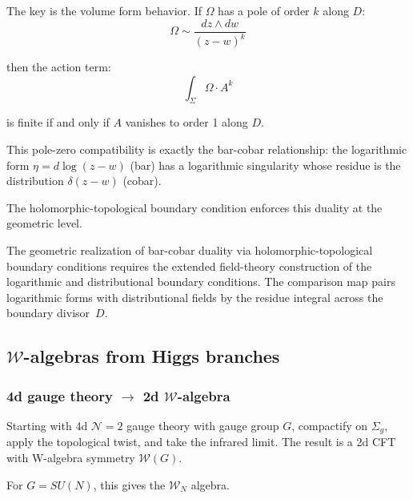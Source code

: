 \begin{remark}
The key is the volume form behavior. If $\Omega$ has a pole of order $k$ along
$D$:
\[\Omega \sim \frac{dz \wedge dw}{(z-w)^k}\]

then the action term:
\[\int_{\Sigma} \Omega \cdot A^k\]

is finite if and only if $A$ vanishes to order 1 along $D$.

This pole-zero compatibility is exactly the bar-cobar relationship: the logarithmic form $\eta = d\log(z-w)$ (bar) has a logarithmic singularity whose residue is the distribution $\delta(z-w)$ (cobar).

The holomorphic-topological boundary condition enforces this duality at the
geometric level.
\end{remark}

\begin{remark}
The geometric realization of bar-cobar duality via
holomorphic-topological boundary conditions requires the extended
field-theory construction of the logarithmic and distributional
boundary conditions. The comparison map pairs logarithmic forms with
distributional fields by the residue integral across the boundary
divisor~$D$.
\end{remark}

\subsection{$\mathcal{W}$-algebras from Higgs branches}

\subsubsection{\texorpdfstring{4d gauge theory $\to$ 2d $\mathcal{W}$-algebra}{4d gauge theory -> 2d $\mathcal{W}$-algebra}}

\begin{remark}
\label{rem:costello-gaiotto-agt}
Starting with 4d $\mathcal{N}=2$ gauge theory with gauge group $G$, compactify on $\Sigma_g$, apply the topological twist, and take the infrared limit. The result is a 2d CFT with W-algebra symmetry $\mathcal{W}(G)$.

For $G = SU(N)$, this gives the $\mathcal{W}_N$ algebra.
\end{remark}

